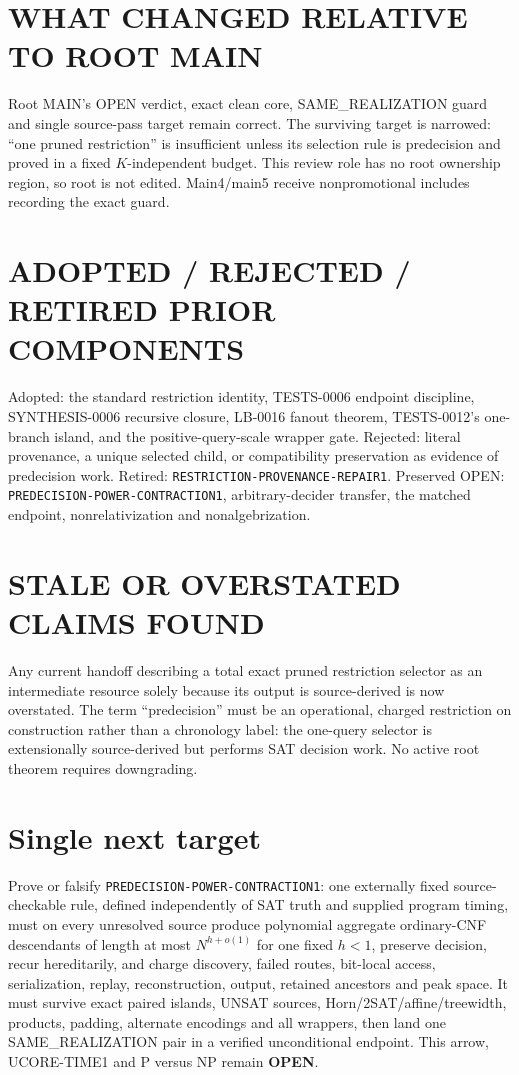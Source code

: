 \documentclass[11pt]{article}
\newcommand{\OPEN}{\textbf{OPEN}}
\begin{document}
\section{WHAT CHANGED RELATIVE TO ROOT MAIN}

Root MAIN's OPEN verdict, exact clean core, SAME\_REALIZATION guard and
single source-pass target remain correct.  The surviving target is narrowed:
``one pruned restriction'' is insufficient unless its selection rule is
predecision and proved in a fixed $K$-independent budget.  This review role
has no root ownership region, so root  is not edited.
Main4/main5 receive nonpromotional includes recording the exact guard.

\section{ADOPTED / REJECTED / RETIRED PRIOR COMPONENTS}

Adopted: the standard restriction identity, TESTS-0006 endpoint discipline,
SYNTHESIS-0006 recursive closure, LB-0016 fanout theorem, TESTS-0012's
one-branch island, and the positive-query-scale wrapper gate.  Rejected:
literal provenance, a unique selected child, or compatibility preservation as
evidence of predecision work.  Retired:
\texttt{RESTRICTION-PROVENANCE-REPAIR1}.  Preserved OPEN:
\texttt{PREDECISION-POWER-CONTRACTION1}, arbitrary-decider transfer, the
matched endpoint, nonrelativization and nonalgebrization.

\section{STALE OR OVERSTATED CLAIMS FOUND}

Any current handoff describing a total exact pruned restriction selector as
an intermediate resource solely because its output is source-derived is now
overstated.  The term ``predecision'' must be an operational, charged
restriction on construction rather than a chronology label: the one-query
selector is extensionally source-derived but performs SAT decision work.
No active root theorem requires downgrading.

\section{Single next target}

Prove or falsify \texttt{PREDECISION-POWER-CONTRACTION1}: one externally
fixed source-checkable rule, defined independently of SAT truth and supplied
program timing, must on every unresolved source produce polynomial aggregate
ordinary-CNF descendants of length at most $N^{h+o(1)}$ for one fixed $h<1$,
preserve decision, recur hereditarily, and charge discovery, failed routes,
bit-local access, serialization, replay, reconstruction, output, retained
ancestors and peak space.  It must survive exact paired islands, UNSAT
sources, Horn/2SAT/affine/treewidth, products, padding, alternate encodings
and all wrappers, then land one SAME\_REALIZATION pair in a verified
unconditional endpoint.  This arrow, UCORE-TIME1 and P versus NP remain
\OPEN.
\end{document}
